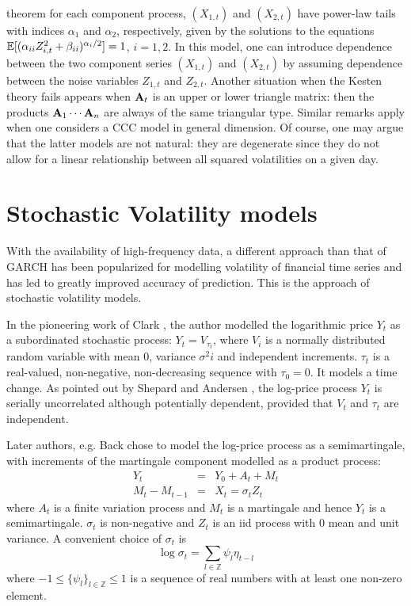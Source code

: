theorem for each component process, $(X_{1,t})$ and $(X_{2,t})$ have
power-law tails  with indices $\alpha_1$ and $\alpha_2$, respectively,
given by the solutions to the equations  $\mathbb{E} [(\alpha_{ii}
Z_{i,t}^2+\beta_{ii})^{\alpha_i/2}]=1$, $i=1,2$. In this model, one
can introduce dependence between the two component series $(X_{1,t})$
and $(X_{2,t})$ by assuming dependence between the noise variables
$Z_{1,t}$ and $Z_{2,t}$. Another situation when the Kesten theory fails 
appears when ${\mathbf A}_t$ is an upper or lower triangle matrix: then the
products  ${\mathbf A}_1\cdots{\mathbf A}_n$ are always of the same triangular
type. 
Similar remarks apply when one considers a CCC model in general
dimension. Of course, one may argue that the latter models 
are not natural: they are degenerate since they do not allow 
for a linear relationship between all squared volatilities on a given
day.

\section{Stochastic Volatility models}
With the availability of high-frequency data, a different approach
than that of GARCH has been popularized for modelling volatility of
financial time series and has led to greatly improved accuracy of
prediction. This is the approach of stochastic volatility models.

In the pioneering work of Clark \cite{clark:1973}, the author modelled
the logarithmic price $Y_t$ as a subordinated stochastic process:
$Y_t = V_{\tau_t}$, where $V_i$ is a normally distributed random
variable with mean 0, variance $\sigma^2 i$ and independent
increments. $\tau_t$ is a real-valued, non-negative, non-decreasing
sequence with $\tau_0 = 0$. It models a time change. As pointed out by
Shepard and Andersen \cite{Shephard:Andersen:2009}, the log-price
process $Y_t$ is serially uncorrelated although potentially dependent,
provided that $V_t$ and $\tau_t$ are independent.

Later authors, e.g. Back \cite{back:1991} chose to model the log-price
process as a semimartingale, with increments of the martingale
component modelled as a product process:
\begin{eqnarray*}
  Y_t &=& Y_0 + A_t + M_t \\
  M_t - M_{t-1} &=& X_t = \sigma_t Z_t
\end{eqnarray*}
where $A_t$ is a finite variation process and $M_t$ is a martingale
and hence $Y_t$ is a semimartingale. $\sigma_t$ is non-negative and
$Z_t$ is an iid process with 0 mean and unit variance. A convenient
choice of $\sigma_t$ is
\[
\log\sigma_t = \sum_{l \in \mathbb Z} \psi_l \eta_{t-l}
\]
where $-1 \leq \{\psi_l\}_{l \in \mathbb Z} \leq 1$
is a sequence of real numbers with at least one non-zero element.


